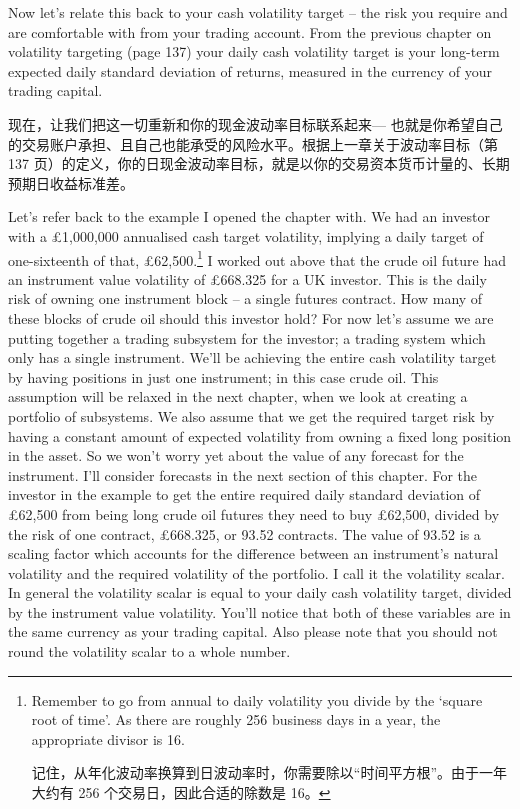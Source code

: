 
\begin{englishblock} Now let's relate this back to your cash volatility target -- the risk you require and are comfortable with from your trading account. From the previous chapter on volatility targeting (page 137) your daily cash volatility target is your long-term expected daily standard deviation of returns, measured in the currency of your trading capital. \end{englishblock}

\begin{chineseblock}现在，让我们把这一切重新和你的现金波动率目标联系起来--- 也就是你希望自己的交易账户承担、且自己也能承受的风险水平。根据上一章关于波动率目标（第 137 页）的定义，你的日现金波动率目标，就是以你的交易资本货币计量的、长期预期日收益标准差。\end{chineseblock}

\bipairgap

\begin{englishblock} Let's refer back to the example I opened the chapter with. We had an investor with a £1,000,000 annualised cash target volatility, implying a daily target of one-sixteenth of that, £62,500.\footnote{Remember to go from annual to daily volatility you divide by the ‘square root of time'. As there are roughly 256 business days in a year, the appropriate divisor is 16. \par 记住，从年化波动率换算到日波动率时，你需要除以“时间平方根”。由于一年大约有 256 个交易日，因此合适的除数是 16。} I worked out above that the crude oil future had an instrument value volatility of £668.325 for a UK investor. This is the daily risk of owning one instrument block -- a single futures contract. How many of these blocks of crude oil should this investor hold? For now let's assume we are putting together a trading subsystem for the investor; a trading system which only has a single instrument. We'll be achieving the entire cash volatility target by having positions in just one instrument; in this case crude oil. This assumption will be relaxed in the next chapter, when we look at creating a portfolio of subsystems. We also assume that we get the required target risk by having a constant amount of expected volatility from owning a fixed long position in the asset. So we won't worry yet about the value of any forecast for the instrument. I'll consider forecasts in the next section of this chapter. For the investor in the example to get the entire required daily standard deviation of £62,500 from being long crude oil futures they need to buy £62,500, divided by the risk of one contract, £668.325, or 93.52 contracts. The value of 93.52 is a scaling factor which accounts for the difference between an instrument's natural volatility and the required volatility of the portfolio. I call it the volatility scalar. In general the volatility scalar is equal to your daily cash volatility target, divided by the instrument value volatility. You'll notice that both of these variables are in the same currency as your trading capital. Also please note that you should not round the volatility scalar to a whole number. \end{englishblock}

